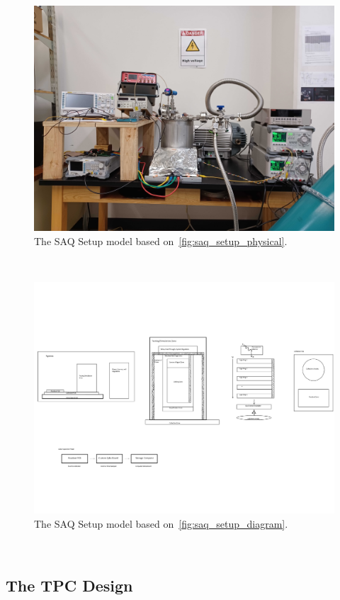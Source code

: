 \begin{figure}[]
\centering
\includegraphics[width=\textwidth]{images/SAQ_physical_setup.jpg}
\caption{The SAQ Setup model based on~\ref{fig:saq_setup_physical}.}
\end{figure}~\label{fig:saq_setup_flatten}

\begin{figure}[]
\centering
\includegraphics[width=\textwidth]{images/SAQ_setup_diagram.pdf}
\caption{The SAQ Setup model based on~\ref{fig:saq_setup_diagram}.}
\end{figure}~\label{fig:saq_setup_flatten}

\subsection{The TPC Design}

